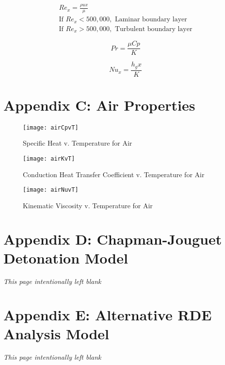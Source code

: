 \begin{equation}
\begin{split}
Re_x=\frac{\rho u x}{\mu}	\\
\text{If } Re_x<500,000, \text{ Laminar boundary layer} \\
\text{If }   Re_x>500,000, \text{ Turbulent boundary layer}
\end{split}
\label{eqn:reynolds}
\end{equation}


\begin{equation}
Pr=\frac{\mu Cp}{K}
\label{eqn:prandtl}
\end{equation}

\begin{equation}
Nu_x=\frac{h_g x}{K}
\label{eqn:nusselt}
\end{equation}

\newpage
\section{Appendix C: Air Properties}
\begin{figure}[H]
\begin{center}
\texttt{[image: airCpvT]}
\caption{Specific Heat v. Temperature for Air}
\label{fig:airCpvT}
\end{center}
\end{figure}


\begin{figure}[H]
\begin{center}
\texttt{[image: airKvT]}
\caption{Conduction Heat Transfer Coefficient v. Temperature for Air}
\label{fig:airKvT}
\end{center}
\end{figure}

\begin{figure}[H]
\begin{center}
\texttt{[image: airNuvT]}
\caption{Kinematic Viscosity v. Temperature for Air}
\label{fig:airNuvT}
\end{center}
\end{figure}

\newpage
\section{Appendix D: Chapman-Jouguet Detonation Model}
\textit{This page intentionally left blank}

\newpage
\section{Appendix E: Alternative RDE Analysis Model}
\textit{This page intentionally left blank}

